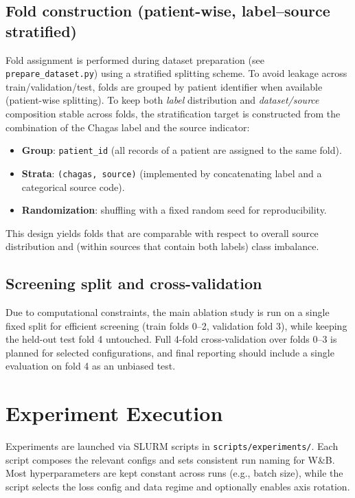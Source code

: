 \subsection{Fold construction (patient-wise, label--source stratified)}
Fold assignment is performed during dataset preparation (see \texttt{prepare\_dataset.py}) using a stratified splitting scheme.
To avoid leakage across train/validation/test, folds are grouped by patient identifier when available (patient-wise splitting).
To keep both \emph{label} distribution and \emph{dataset/source} composition stable across folds, the stratification target is constructed from the combination of the Chagas label and the source indicator:
\begin{itemize}
  \item \textbf{Group}: \texttt{patient\_id} (all records of a patient are assigned to the same fold).
  \item \textbf{Strata}: \texttt{(chagas, source)} (implemented by concatenating label and a categorical source code).
  \item \textbf{Randomization}: shuffling with a fixed random seed for reproducibility.
\end{itemize}
This design yields folds that are comparable with respect to overall source distribution and (within sources that contain both labels) class imbalance.

\subsection{Screening split and cross-validation}
Due to computational constraints, the main ablation study is run on a single fixed split for efficient screening (train folds 0--2, validation fold 3), while keeping the held-out test fold 4 untouched.
Full 4-fold cross-validation over folds 0--3 is planned for selected configurations, and final reporting should include a single evaluation on fold 4 as an unbiased test.

\section{Experiment Execution}
Experiments are launched via SLURM scripts in \texttt{scripts/experiments/}. Each script composes the relevant configs and sets consistent run naming for W\&B.
Most hyperparameters are kept constant across runs (e.g., batch size), while the script selects the loss config and data regime and optionally enables axis rotation.
